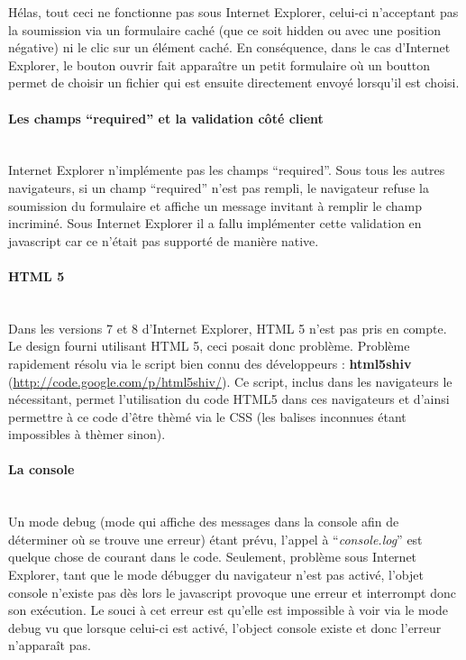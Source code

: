 \documentclass{article}
\begin{document}
\begin{sffamily}
Hélas, tout ceci ne fonctionne pas sous Internet Explorer, celui-ci n'acceptant pas la soumission via un formulaire caché (que ce soit hidden ou avec une position négative) 
ni le clic sur un élément caché. En conséquence, dans le cas d'Internet Explorer, le bouton ouvrir fait apparaître un petit formulaire où un boutton permet de choisir un 
fichier qui est ensuite directement envoyé lorsqu'il est choisi.

\paragraph{Les champs ``required'' et la validation côté client}$ $\\

Internet Explorer n'implémente pas les champs ``required''. Sous tous les autres navigateurs, si un champ ``required'' n'est pas rempli, le navigateur refuse la soumission 
du formulaire et affiche un message invitant à remplir le champ incriminé. Sous Internet Explorer il a fallu implémenter cette validation en javascript car ce n'était pas 
supporté de manière native.

\paragraph{HTML 5}$ $\\

Dans les versions 7 et 8 d'Internet Explorer, HTML 5 n'est pas pris en compte. Le design fourni utilisant HTML 5, ceci posait donc problème. Problème rapidement résolu via 
le script bien connu des développeurs : \textbf{html5shiv} (\url{http://code.google.com/p/html5shiv/}). Ce script, inclus dans les navigateurs le nécessitant, permet 
l'utilisation du code HTML5 dans ces navigateurs et d'ainsi permettre à ce code d'être thèmé via le CSS (les balises inconnues étant impossibles à thèmer sinon).

\paragraph{La console}$ $\\

Un mode debug (mode qui affiche des messages dans la console afin de déterminer où se trouve une erreur) étant prévu, l'appel à ``\textit{console.log}'' est quelque chose de 
courant dans le code. Seulement, problème sous Internet Explorer, tant que le mode débugger du navigateur n'est pas activé, l'objet console n'existe pas dès lors le 
javascript provoque une erreur et interrompt donc son exécution. Le souci à cet erreur est qu'elle est impossible à voir via le mode debug vu que lorsque celui-ci est 
activé, l'object console existe et donc l'erreur n'apparaît pas. \\


\end{sffamily}
\end{document}
